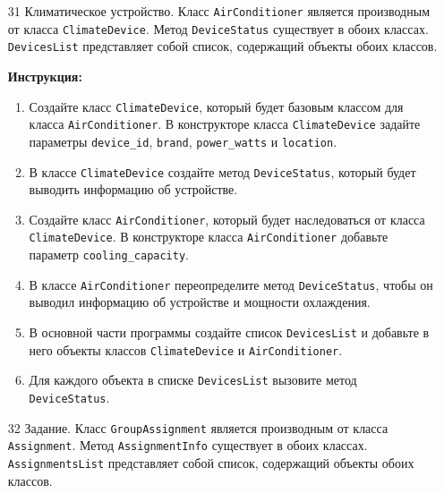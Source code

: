 \begin{enumerate}
\item[31]
Климатическое устройство. Класс \texttt{AirConditioner} является производным от класса \texttt{ClimateDevice}. Метод \texttt{DeviceStatus} существует в обоих классах. \texttt{DevicesList} представляет собой список, содержащий объекты обоих классов.

\textbf{Инструкция:}
\begin{enumerate}
    \item Создайте класс \texttt{ClimateDevice}, который будет базовым классом для класса \texttt{AirConditioner}. В конструкторе класса \texttt{ClimateDevice} задайте параметры \texttt{device\_id}, \texttt{brand}, \texttt{power\_watts} и \texttt{location}.
    \item В классе \texttt{ClimateDevice} создайте метод \texttt{DeviceStatus}, который будет выводить информацию об устройстве.
    \item Создайте класс \texttt{AirConditioner}, который будет наследоваться от класса \texttt{ClimateDevice}. В конструкторе класса \texttt{AirConditioner} добавьте параметр \texttt{cooling\_capacity}.
    \item В классе \texttt{AirConditioner} переопределите метод \texttt{DeviceStatus}, чтобы он выводил информацию об устройстве и мощности охлаждения.
    \item В основной части программы создайте список \texttt{DevicesList} и добавьте в него объекты классов \texttt{ClimateDevice} и \texttt{AirConditioner}.
    \item Для каждого объекта в списке \texttt{DevicesList} вызовите метод \texttt{DeviceStatus}.
\end{enumerate}

\item[32]
Задание. Класс \texttt{GroupAssignment} является производным от класса \texttt{Assignment}. Метод \texttt{AssignmentInfo} существует в обоих классах. \texttt{AssignmentsList} представляет собой список, содержащий объекты обоих классов.


\end{enumerate}
